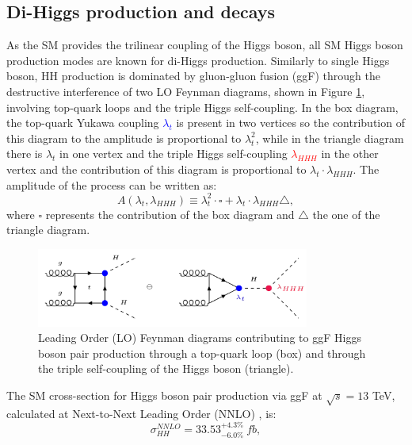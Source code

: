 \subsection{Di-Higgs production and decays} 
\label{chap1:HH:HPD}
As the SM provides the trilinear coupling of the Higgs boson, all SM Higgs boson production modes are known for di-Higgs production. Similarly to single Higgs boson, HH production is dominated by gluon-gluon fusion (ggF) through the destructive interference of two LO Feynman diagrams, shown in Figure \ref{fig:chap1:HH:HPD:FY}, involving top-quark loops and the triple Higgs self-coupling. In the box diagram, the top-quark Yukawa coupling \textcolor{blue}{$\lambda_t$} is present in two vertices so the contribution of this diagram to the amplitude is proportional to $\lambda_t^2$, while in the triangle diagram there is $\lambda_t$ in one vertex and the triple Higgs self-coupling \textcolor{red}{$\lambda_{HHH}$} in the other vertex and the contribution of this diagram is proportional to $\lambda_t\cdot\lambda_{HHH}$. The amplitude of the process can be written as:
\begin{equation}
    A(\lambda_t, \lambda_{HHH}) \equiv \lambda_t^2\cdot\square + \lambda_t\cdot\lambda_{HHH}\bigtriangleup,
\end{equation}
where $\square$ represents the contribution of the box diagram and $\bigtriangleup$ the one of the triangle diagram. 
\begin{figure}[htbp]
    \centering
    \includegraphics[width=0.8\textwidth]{Ch1/Img/HH_feyn.png}
    \begin{tcolorbox}[colback=black!5!white,colframe=white!75!black]
    \caption{Leading Order (LO) Feynman diagrams contributing to ggF Higgs boson pair production through a top-quark loop (box) and through the triple self-coupling of the Higgs boson (triangle).}
    \label{fig:chap1:HH:HPD:FY}
    \end{tcolorbox}
\end{figure}
The SM cross-section for Higgs boson pair production via ggF at $\sqrt{s}=13$ TeV, calculated at Next-to-Next Leading Order (NNLO) \cite{HHXSec1, HHXSec2}, is:
\begin{equation}
    \sigma_{HH}^{NNLO} = 33.53_{-6.0\%}^{+4.3\%} \ fb,
    \label{eq:chap1:HH:XSEC:NNL0}
\end{equation}

